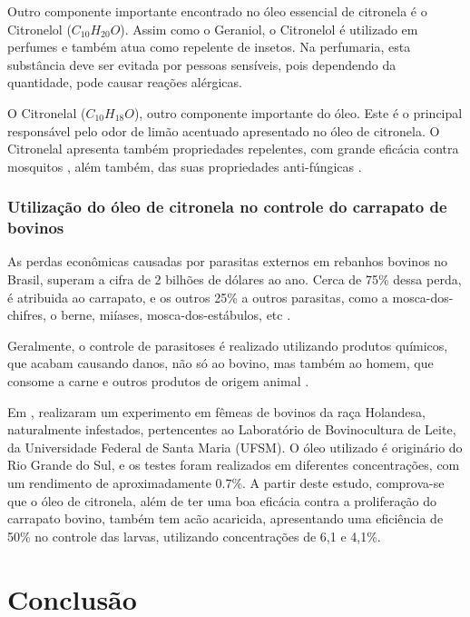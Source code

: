 \documentclass[
	article,			%
	11pt,				%
	oneside,			%
	a4paper,			%
	english,			%
	brazil,				%
	]{abntex2}
\begin{document}
Outro componente importante encontrado no óleo essencial de citronela é o Citronelol ($C_{10}H_{20}O$). Assim como o Geraniol, o Citronelol é utilizado em perfumes e também atua como repelente de insetos. Na perfumaria, esta substância deve ser evitada por pessoas sensíveis, pois dependendo da quantidade, pode causar reações alérgicas.

O Citronelal ($C_{10}H_{18}O$), outro componente importante do óleo. Este é o principal responsável pelo odor de limão acentuado apresentado no óleo de citronela. O Citronelal apresenta também propriedades repelentes, com grande eficácia contra mosquitos \cite{kim2005}, além também, das suas propriedades anti-fúngicas \cite{nakahara2003}.

\subsubsection{Utilização do óleo de citronela no controle do carrapato de bovinos}

As perdas econômicas causadas por parasitas externos em rebanhos bovinos no Brasil, superam a cifra de 2 bilhões de dólares ao ano. Cerca de 75\% dessa perda, é atribuida ao carrapato, e os outros 25\% a outros parasitas, como a mosca-dos-chifres, o berne, miíases, mosca-dos-estábulos, etc \cite{grisi2002}. 

Geralmente, o controle de parasitoses é realizado utilizando produtos químicos, que acabam causando danos, não só ao bovino, mas também ao homem, que consome a carne e outros produtos de origem animal \cite{chagas2003}.

Em \citeyear{clair2008}, \citeauthor{clair2008} realizaram um experimento em fêmeas de bovinos da raça Holandesa, naturalmente infestados, pertencentes ao Laboratório de Bovinocultura de Leite, da Universidade Federal de Santa Maria (UFSM). O óleo utilizado é originário do Rio Grande do Sul, e os testes foram realizados em diferentes concentrações, com um rendimento de aproximadamente 0.7\%. A partir deste estudo, comprova-se que o óleo de citronela, além de ter uma boa eficácia contra a proliferação do carrapato bovino, também tem acão acaricida, apresentando uma eficiência de 50\% no controle das larvas, utilizando concentrações de 6,1 e 4,1\%.

\section{Conclusão}
\end{document}

